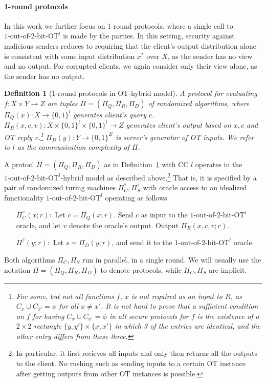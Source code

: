\documentclass[a4paper]{article}
\newtheorem{definition}{Definition}[section]
\newcommand{\OT}[2]{#1\text{-out-of-}#2\text{-bit-OT}}
\begin{document}
\paragraph{1-round protocols}

In this work we further focus on 1-round protocols, where a single call to ${\OT{1}{2}}^l$ is made by the parties.
In this setting, security against malicious senders reduces to requiring that the 
client's output distribution alone is consistent with some input distribution $x^*$ over $X$, as the sender has no view and no output.
For corrupted clients, we again consider only their view alone, as the sender has no output. 

\begin{definition}[1-round protocols in OT-hybrid model]\label{def-prot}
	A protocol for evaluating $f:X\times Y\rightarrow Z$ are tuples $\Pi=(\Pi_Q,\Pi_R,\Pi_D)$ of randomized algorithms, where $\Pi_Q(x):X\rightarrow \{0,1\}^l$ generates client's query $c$. $\Pi_R(x,c,v):X\times\{0,1\}^l\times  \{0,1\}^l\rightarrow Z$ generates client's output based on $x,c$ and OT reply $v$.\footnote{For some, but not all functions $f$, $x$ is not required as an input to $R$, as $C_x\cup C_{x'}=\phi$ for all $x\neq x'$. It is not hard to prove that a sufficient condition on $f$ for having $C_x\cup C_{x'}=\phi$ in all secure protocols for $f$ is the existence of a $2\times 2$ rectangle $\{y,y'\}\times\{x,x'\}$ in which 3 of the entries are identical, and the other entry differs from these three.} $\Pi_D(y):Y\rightarrow \{0,1\}^{2l}$ is server's generator of OT inputs. We refer to $l$ as the communication complexity of $\Pi$.
\end{definition}



A protocl $\Pi=(\Pi_Q,\Pi_R,\Pi_D)$ as in Definition~\ref{def-prot} with CC $l$ operates in the ${\OT{1}{2}}^l$-hybrid model as described above.\footnote{In particular, it first recieves all inputs and only then returns all the outputs to the client. No rushing such as sending inputs to a certain OT instance after getting outputs from other OT instances is possible.}
That is, it is specified by a pair of randomized turing machines $\Pi^?_C,\Pi^?_S$ with oracle access to an idealized functionality ${\OT{1}{2}}^l$ operating as follows
\begin{enumerate}
	\item[$\Pi^?_C(x;r):$] 
	Let $c=\Pi_Q(x;r)$. Send $c$ as input to the ${\OT{1}{2}}^l$ oracle, and let $v$ denote the oracle's output. Output $\Pi_R(x,c,v;r)$.
	\item[$\Pi^?(y;r):$] Let $s=\Pi_D(y;r)$, and send it to the 
	${\OT{1}{2}}^l$ oracle.  
\end{enumerate}
Both algorithms $\Pi_C,\Pi_S$ run in parallel, in a single round.
We will usually use the notation $\Pi=(\Pi_Q,\Pi_R,\Pi_D)$ to denote protocols, while $\Pi_C,\Pi_S$ are implicit.
\end{document}
